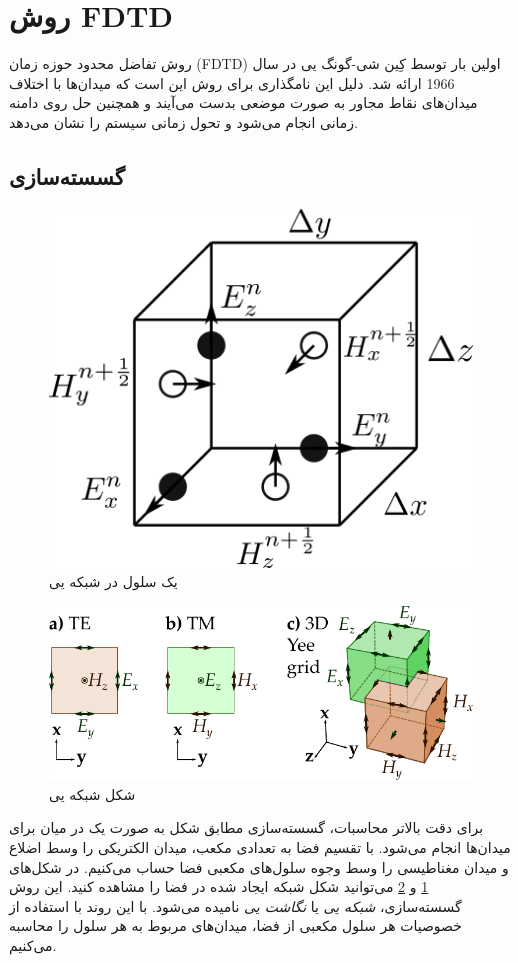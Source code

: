\documentclass[12pt,a4paper]{article}
\begin{document}
	\section{روش FDTD}
	روش تفاضل محدود حوزه زمان (FDTD) اولین بار توسط کِین شی-گونگ یی در سال 1966 ارائه شد.
	دلیل این نامگذاری برای روش این است که میدان‌ها با اختلاف میدان‌های نقاط مجاور به صورت موضعی بدست می‌آیند و همچنین حل
	روی دامنه زمانی انجام می‌شود و تحول زمانی سیستم را نشان می‌دهد.
	\subsection{گسسته‌سازی}
	\begin{figure}
		\centering
		\includegraphics[width=0.6\linewidth]{yee_cell}
		\caption{یک سلول در شبکه یی}
		\label{yee cell}
	\end{figure}
	\begin{figure}
		\centering
		\includegraphics[width=0.6\linewidth]{yee_grid}
		\caption{شکل شبکه یی}
		\label{yee grid}
	\end{figure}
	برای دقت بالاتر محاسبات، گسسته‌سازی مطابق شکل به صورت یک در میان برای میدان‌ها انجام می‌شود.
	با تقسیم فضا به تعدادی مکعب، میدان الکتریکی را وسط اضلاع و میدان مغناطیسی را وسط وجوه سلول‌های مکعبی فضا حساب می‌کنیم.
	در شکل‌های \ref{yee cell} و \ref{yee grid} می‌توانید شکل شبکه ایجاد شده در فضا را مشاهده کنید.
	این روش گسسته‌سازی، \emph{شبکه یی} یا \emph{نگاشت یی} نامیده می‌شود.
	با این روند با استفاده از خصوصیات هر سلول مکعبی از فضا، میدان‌های مربوط به هر سلول را محاسبه می‌کنیم.
	
\end{document}
